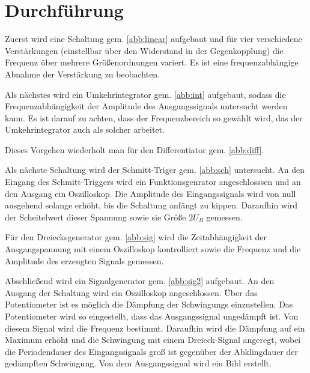 \section{Durchf{\"u}hrung}
Zuerst wird eine Schaltung gem. \ref{abb:linear} aufgebaut und für vier verschiedene Verstärkungen (einstellbar über den Widerstand in der Gegenkopplung)
die Frequenz über mehrere Größenordnungen variert. Es ist eine frequenzabhängige Abnahme der Verstärkung zu beobachten.

Als nächstes wird ein Umkehrintegrator gem. \ref{abb:int} aufgebaut, sodass die
Frequenzabhängigkeit der Amplitude des Ausgangssignals untersucht werden kann. Es
ist darauf zu achten, dass der Frequenzbereich so gewählt wird, das der Umkehrintegrator
auch als solcher arbeitet.

Dieses Vorgehen wiederholt man für den Differentiator gem. \ref{abb:diff}.

Als nächste Schaltung wird der Schmitt-Triger gem. \ref{abb:sch} untersucht.
An den Eingang des Schmitt-Triggers wird ein Funktionsgenrator angeschlosssen und an den Ausgang
ein Oszilloskop. Die Amplitude des Eingangssignals wird von null ausgehend solange erhöht,
bis die Schaltung anfängt zu kippen. Daraufhin wird der Scheitelwert dieser Spannung sowie
sie Größe $2U_B$ gemessen.

Für den Dreiecksgenerator gem. \ref{abb:sig} wird die Zeitabhängigkeit der Ausgangspannung mit einem
Oszilloskop kontrolliert sowie die Frequenz und die Amplitude des erzeugten Signals gemessen.

Abschließend wird ein Signalgenerator gem. \ref{abb:sig2} aufgebaut. An den Ausgang der Schaltung
wird ein Oszilloskop angeschlossen. Über das Potentiometer ist es möglich die Dämpfung der Schwingungs
einzustellen. Das Potentiometer wird so eingestellt, dass das Ausgangssignal ungedämpft ist. Von diesem Signal wird
die Frequenz bestimmt. Daraufhin wird die Dämpfung auf ein Maximum erhöht und
die Schwingung mit einem Dreieck-Signal angeregt, wobei die Periodendauer des Eingangssignals groß ist
gegenüber der Abklingdauer der gedämpften Schwingung. Von dem Ausgangssignal wird ein Bild erstellt.

